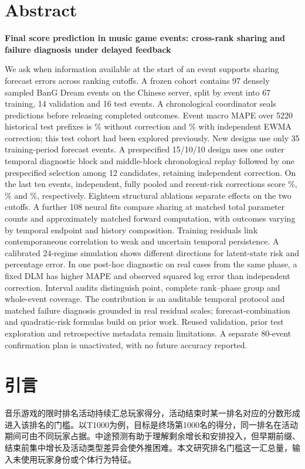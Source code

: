 \documentclass[preprint,12pt]{elsarticle}
\begin{document}
\section*{Abstract}
{\raggedright\noindent\textbf{Final score prediction in music game events: cross-rank sharing and failure diagnosis under delayed feedback}\par}
We ask when information available at the start of an event supports sharing forecast errors across ranking cutoffs. A frozen cohort contains 97 densely sampled BanG Dream events on the Chinese server, split by event into 67 training, 14 validation and 16 test events. A chronological coordinator seals predictions before releasing completed outcomes. Event macro MAPE over 5220 historical test prefixes is \BaseTest\% without correction and \EwmaTest\% with independent EWMA correction; this test cohort had been explored previously. New designs use only 35 training-period forecast events. A prespecified 15/10/10 design uses one outer temporal diagnostic block and middle-block chronological replay followed by one prespecified selection among 12 candidates, retaining independent correction. On the last ten events, independent, fully pooled and recent-risk corrections score \RTIndependent\%, \RTPool\% and \RTRisk\%, respectively. Eighteen structural ablations separate effects on the two cutoffs. A further 108 neural fits compare sharing at matched total parameter counts and approximately matched forward computation, with outcomes varying by temporal endpoint and history composition. Training residuals link contemporaneous correlation to weak and uncertain temporal persistence. A calibrated 24-regime simulation shows different directions for latent-state risk and percentage error. In one post-hoc diagnostic on real cases from the same phase, a fixed DLM has higher MAPE and observed squared log error than independent correction. Interval audits distinguish point, complete rank--phase group and whole-event coverage. The contribution is an auditable temporal protocol and matched failure diagnosis grounded in real residual scales; forecast-combination and quadratic-risk formulas build on prior work. Reused validation, prior test exploration and retrospective metadata remain limitations. A separate 80-event confirmation plan is unactivated, with no future accuracy reported.

\section{引言}
音乐游戏的限时排名活动持续汇总玩家得分，活动结束时某一排名对应的分数形成进入该排名的门槛。以T1000为例，目标是终场第1000名的得分，同一排名在活动期间可由不同玩家占据。中途预测有助于理解剩余增长和安排投入，但早期前缀、结束前集中增长及活动类型差异会使外推困难。本文研究排名门槛这一汇总量，输入未使用玩家身份或个体行为特征。
\end{document}
